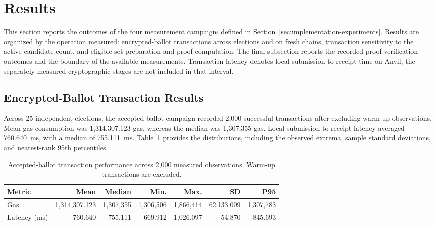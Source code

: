 \section{Results}
\label{sec:07}
\label{sec:results}

This section reports the outcomes of the four measurement campaigns defined in Section~\ref{sec:implementation-experiments}. Results are organized by the operation measured: encrypted-ballot transactions across elections and on fresh chains, transaction sensitivity to the active candidate count, and eligible-set preparation and proof computation. The final subsection reports the recorded proof-verification outcomes and the boundary of the available measurements. Transaction latency denotes local submission-to-receipt time on Anvil; the separately measured cryptographic stages are not included in that interval.

\subsection{Encrypted-Ballot Transaction Results}
\label{subsec:results-accepted-ballots}

Across 25 independent elections, the accepted-ballot campaign recorded 2,000 successful transactions after excluding warm-up observations. Mean gas consumption was 1,314,307.123 gas, whereas the median was 1,307,355 gas. Local submission-to-receipt latency averaged 760.640~ms, with a median of 755.111~ms. Table~\ref{tab:results-accepted-overall} provides the distributions, including the observed extrema, sample standard deviations, and nearest-rank 95th percentiles.

\begin{table}[t]
\centering
\caption{Accepted-ballot transaction performance
across 2,000 measured observations.
Warm-up transactions are excluded.}
\label{tab:results-accepted-overall}
\scriptsize
\setlength{\tabcolsep}{3pt}
\begin{tabular}{@{}lrrrrrr@{}}
\toprule
\textbf{Metric} &
\textbf{Mean} &
\textbf{Median} &
\textbf{Min.} &
\textbf{Max.} &
\textbf{SD} &
\textbf{P95} \\
\midrule
Gas
& 1,314,307.123
& 1,307,355
& 1,306,506
& 1,866,414
& 62,133.009
& 1,307,783 \\
Latency (ms)
& 760.640
& 755.111
& 669.912
& 1,026.097
& 54.870
& 845.693 \\
\bottomrule
\end{tabular}
\end{table}

